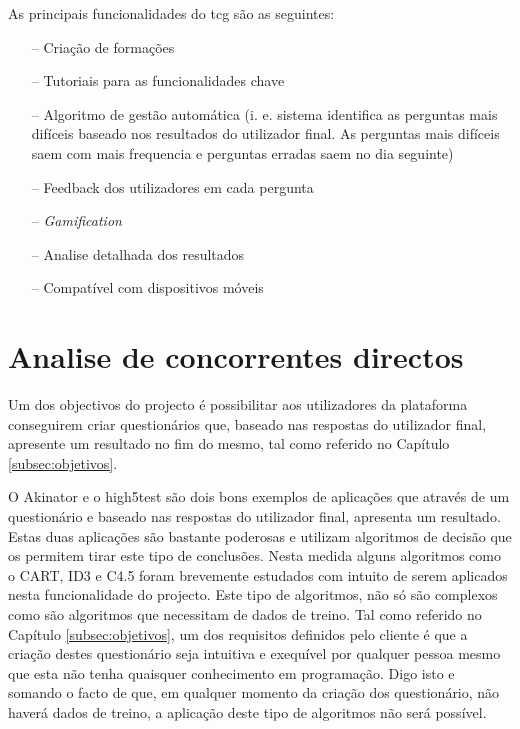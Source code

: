  As principais funcionalidades do  \acrshort{tcg}  são as seguintes:


\begin{itemize}
	\item[--] Criação de formações 
	\item[--] Tutoriais para as funcionalidades chave
	\item[--] Algoritmo de gestão automática (i. e. sistema identifica as perguntas mais difíceis baseado nos resultados do utilizador final. As perguntas mais difíceis saem com mais frequencia e perguntas erradas saem no dia seguinte)
	\item[--] Feedback dos utilizadores em cada pergunta
	\item[--] \textit{Gamification}
	\item[--] Analise detalhada dos resultados
	\item[--] Compatível com dispositivos móveis
\end{itemize}

\section{Analise de concorrentes directos}

Um dos objectivos do projecto é possibilitar aos utilizadores da plataforma conseguirem criar questionários que, baseado nas respostas do utilizador final, apresente um resultado no fim do mesmo, tal como referido no Capítulo \ref{subsec:objetivos}.

O Akinator\cite{akinator} e o high5test\cite{5} são dois bons exemplos de aplicações que através de um questionário e baseado nas respostas do utilizador final, apresenta um resultado. Estas duas aplicações são bastante poderosas e utilizam algoritmos de decisão que os permitem tirar este tipo de conclusões. Nesta medida alguns algoritmos como o CART\cite{cart}, ID3\cite{id3}\cite{id3_2}\cite{cart} e C4.5\cite{cart}\cite{c4.5} foram brevemente estudados com intuito de serem aplicados nesta funcionalidade do projecto. Este tipo de algoritmos, não só são complexos como são algoritmos que necessitam de dados de treino. Tal como referido no Capítulo \ref{subsec:objetivos}, um dos requisitos definidos pelo cliente é que a criação destes questionário seja intuitiva e exequível por qualquer pessoa mesmo que esta não tenha quaisquer conhecimento em programação. Digo isto e somando o facto de que, em qualquer momento da criação dos questionário, não haverá dados de treino, a aplicação deste tipo de algoritmos não será possível.

